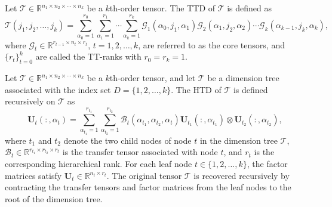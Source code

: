\documentclass[onefignum,onetabnum]{siamart250211}
\begin{document}
\begin{definition} [TTD]
    Let $\mathscr{T}\in\mathbb{R}^{n_1\times n_2\times\cdots\times n_k}$ be a $k$th-order tensor. The TTD of $\mathscr{T}$ is defined as
\begin{equation*}
\mathscr{T}(j_1,j_2,\dots,j_k)
=
\sum_{\alpha_0=1}^{r_0}\sum_{\alpha_1=1}^{r_1}\cdots \sum_{\alpha_k=1}^{r_k}
\mathscr{G}_1(\alpha_0,j_1,\alpha_1)
\mathscr{G}_2(\alpha_1,j_2,\alpha_2)
\cdots
\mathscr{G}_k(\alpha_{k-1},j_k,\alpha_k),
\end{equation*}
where $\mathscr{G}_t\in\mathbb{R}^{r_{t-1}\times n_t\times r_t}$, $t=1,2,\dots,k$, are referred to as the core tensors, and $\{r_t\}_{t=0}^{k}$ are called the TT-ranks with $r_0=r_k=1$.
\end{definition} 

\begin{definition}[HTD]
Let $\mathscr{T}\in\mathbb{R}^{n_1\times n_2\times\cdots\times n_k}$ be a $k$th-order tensor, and let  $\mathcal{T}$ be a dimension tree associated with the index set $D=\{1,2,\dots,k\}$. The HTD of $\mathscr{T}$ is defined recursively on $\mathcal{T}$ as
\begin{equation*}
\textbf{U}_t(:,\alpha_t)=
\sum_{\alpha_{t_1}=1}^{r_{t_1}}
\sum_{\alpha_{t_2}=1}^{r_{t_2}}
\mathscr{B}_t(\alpha_{t_1},\alpha_{t_2},\alpha_t)
\textbf{U}_{t_1}(:,\alpha_{t_1})
\otimes
\textbf{U}_{t_2}(:,\alpha_{t_2}),
\end{equation*}
where $t_1$ and $t_2$ denote the two child nodes of node $t$ in the dimension tree $\mathcal{T}$, $\mathscr{B}_t\in
\mathbb{R}^{r_{t_1}\times r_{t_2}\times r_t}$ is  the transfer tensor associated with node $t$, and $r_t$ is the corresponding hierarchical rank. For each leaf node $t\in\{1,2,\dots,k\}$, the factor matrices satisfy $\textbf{U}_{t}\in\mathbb{R}^{n_t\times r_t}$. The original tensor $\mathscr{T}$ is recovered recursively by contracting the transfer tensors and factor matrices from the leaf nodes to the root of the dimension tree.
\end{definition}
\end{document}

